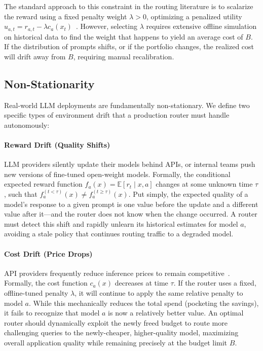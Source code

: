 The standard approach to this constraint in the routing literature is to scalarize the reward using a fixed penalty weight $\lambda > 0$, optimizing a penalized utility $u_{a,t} = r_{a,t} - \lambda c_a(x_t)$~\cite{ong2024routellm}. However, selecting $\lambda$ requires extensive offline simulation on historical data to find the weight that happens to yield an average cost of $B$. If the distribution of prompts shifts, or if the portfolio changes, the realized cost will drift away from $B$, requiring manual recalibration.

\subsection{Non-Stationarity}

Real-world LLM deployments are fundamentally non-stationary. We define two specific types of environment drift that a production router must handle autonomously:

\paragraph{Reward Drift (Quality Shifts)}
LLM providers silently update their models behind APIs, or internal teams push new versions of fine-tuned open-weight models. Formally, the conditional expected reward function $f_a(x) = \mathbb{E}[r_t \mid x, a]$ changes at some unknown time $\tau$, such that $f_a^{(t < \tau)}(x) \neq f_a^{(t \geq \tau)}(x)$.  Put simply, the expected quality of a model's response to a given prompt is one value before the update and a different value after it---and the router does not know when the change occurred.  A router must detect this shift and rapidly unlearn its historical estimates for model $a$, avoiding a stale policy that continues routing traffic to a degraded model.

\paragraph{Cost Drift (Price Drops)}
API providers frequently reduce inference prices to remain competitive~\cite{thompson2026timeline}. Formally, the cost function $c_a(x)$ decreases at time $\tau$. If the router uses a fixed, offline-tuned penalty $\lambda$, it will continue to apply the same relative penalty to model $a$. While this mechanically reduces the total spend (pocketing the savings), it fails to recognize that model $a$ is now a relatively better value. An optimal router should dynamically exploit the newly freed budget to route more challenging queries to the newly-cheaper, higher-quality model, maximizing overall application quality while remaining precisely at the budget limit $B$.